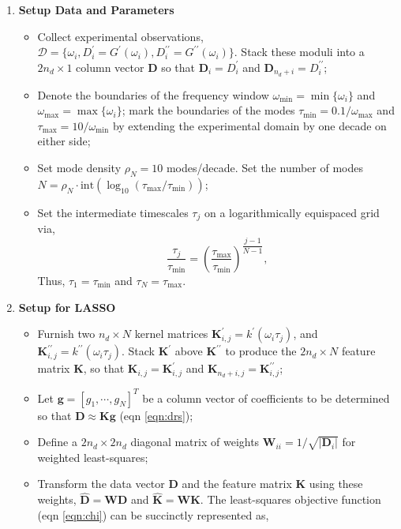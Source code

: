\documentclass[11pt,letterpaper]{article}
\newcommand{\Tp}{G^{\prime}}
\newcommand{\Tpp}{G^{\prime\prime}}
\begin{document}
\begin{enumerate}
\item \textbf{Setup Data and Parameters}
\begin{itemize}
\item Collect experimental observations, $\mathcal{D} = \{\omega_i, D_i^{\prime} = \Tp(\omega_i), D_i^{\prime\prime}=\Tpp(\omega_i)\}$. Stack these moduli into a $2n_d \times 1$ column vector $\mathbf{D}$ so that $\mathbf{D}_{i} =   D_i^{\prime}$ and $\mathbf{D}_{n_d + i} =   D_i^{\prime\prime}$;
\item Denote the boundaries of the frequency window $\omega_{\min} = \min\{\omega_i\}$ and $\omega_{\max} = \max\{\omega_i\}$; mark the boundaries of the modes  $\tau_{\min} = 0.1/\omega_{\max}$ and $\tau_{\max} = 10/\omega_{\min}$ by extending the experimental domain by one decade on either side;
\item Set mode density $\rho_N = 10$ modes/decade. Set the number of modes $N = \rho_N \cdot \text{int}(\log_{10} (\tau_{\max}/\tau_{\min}))$;
\item Set the intermediate timescales $\tau_j$ on a logarithmically equispaced grid via,
\begin{equation}
\dfrac{\tau_j}{\tau_{\min}} = \left(\dfrac{\tau_{\max}}{\tau_{\min}} \right)^{\dfrac{j-1}{N-1}},
\end{equation}
Thus, $\tau_1 = \tau_{\min}$ and $\tau_N = \tau_{\max}$.
\end{itemize}
\item \textbf{Setup for LASSO}
\begin{itemize}
\item Furnish two $n_d \times N$ kernel matrices $\mathbf{K}^{\prime}_{i,j} = k^{\prime}(\omega_i \tau_j)$, and $\mathbf{K}^{\prime\prime}_{i,j} = k^{\prime\prime}(\omega_i  \tau_j)$. Stack $\mathbf{K}^{\prime}$ above $\mathbf{K}^{\prime\prime}$ to produce the $2n_d \times N$ feature matrix $\mathbf{K}$, so that $\mathbf{K}_{i,j} = \mathbf{K}^{\prime}_{i,j}$ and $\mathbf{K}_{n_d+i,j} = \mathbf{K}^{\prime \prime}_{i,j}$;
\item Let $\mathbf{g} = [g_1, \cdots, g_N]^T$ be a column vector of coefficients to be determined so that $\mathbf{D} \approx \mathbf{K g}$ (eqn \ref{eqn:drs});
\item Define a $2n_d \times 2n_d$ diagonal matrix of weights $\mathbf{W}_{ii} = 1/\sqrt{|\mathbf{D}_i|}$ for weighted least-squares;
\item Transform the data vector $\mathbf{D}$ and the feature matrix $\mathbf{K}$ using these weights, $\hat{\mathbf{D}} = \mathbf{W D}$ and $\hat{\mathbf{K}} = \mathbf{W K}$. The least-squares objective function (eqn \ref{eqn:chi}) can be succinctly represented as,

\end{itemize}
\end{enumerate}
\end{document}
